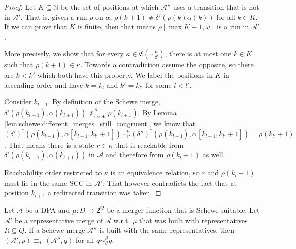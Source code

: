 \begin{proof}
	Let $K \subseteq \mathbb{N}$ be the set of positions at which $\mathcal{A}''$ uses a transition that is not in $\mathcal{A}'$. That is, given a run $\rho$ on $\alpha$, $\rho(k+1) \neq \delta'(\rho(k) \alpha(k))$ for all $k \in K$. If we can prove that $K$ is finite, then that means $\rho[\max K + 1, \omega]$ is a run in $\mathcal{A}'$.
	
	More precisely, we show that for every $\kappa \in \mathfrak{C}(\sim_\mathcal{C}^\mu)$, there is at most one $k \in K$ such that $\rho(k+1) \in \kappa$. Towards a contradiction assume the opposite, so there are $k < k'$ which both have this property. We label the positions in $K$ in ascending order and have $k = k_l$ and $k' = k_{l'}$ for some $l < l'$.
	
	Consider $k_{l+1}$. By definition of the Schewe merge, $\delta'(\rho(k_{l+1}), \alpha(k_{l+1})) \not\preceq_\text{reach}^\mathcal{A} \rho(k_{l+1})$. By Lemma \ref{lem:schewe:different_merges_still_congruent}, we know that $(\delta')^*(\rho(k_{l+1}), \alpha[k_{l+1}, k_{l'}+1]) \sim_\mathcal{C}^\mu (\delta'')^*(\rho(k_{l+1}), \alpha[k_{l+1}, k_{l'}+1]) = \rho(k_{l'}+1)$. That means there is a state $r \in \kappa$ that is reachable from $\delta'(\rho(k_{l+1}), \alpha(k_{l+1}))$ in $\mathcal{A}$ and therefore from $\rho(k_l + 1)$ as well.
	
	Reachability order restricted to $\kappa$ is an equivalence relation, so $r$ and $\rho(k_l + 1)$ must lie in the same SCC in $\mathcal{A}'$. That however contradicts the fact that at position $k_{l+1}$ a redirected transition was taken.
\end{proof}


\begin{lem}
	Let $\mathcal{A}$ be a DPA and $\mu : D \rightarrow 2^Q$ be a merger function that is Schewe suitable. Let $\mathcal{A}'$ be a representative merge of $\mathcal{A}$ w.r.t. $\mu$ that was built with representatives $R \subseteq Q$. If a Schewe merge $\mathcal{A}''$ is built with the same representatives, then $(\mathcal{A}', p) \equiv_L (\mathcal{A}'', q)$ for all $q \sim_\mathcal{C}^\mu q$.
	\label{lem:schewe:schewe_suitable_works}
\end{lem}


